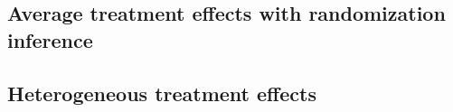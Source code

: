 \documentclass[11pt]{article}
\begin{document}
        
        
        
        
        
        
        
        
        

    \clearpage

    \subsection{Average treatment effects with randomization inference}

        
        
        
        
        
        
        
        
        
        

    \clearpage

	\subsection{Heterogeneous treatment effects}
\end{document}
